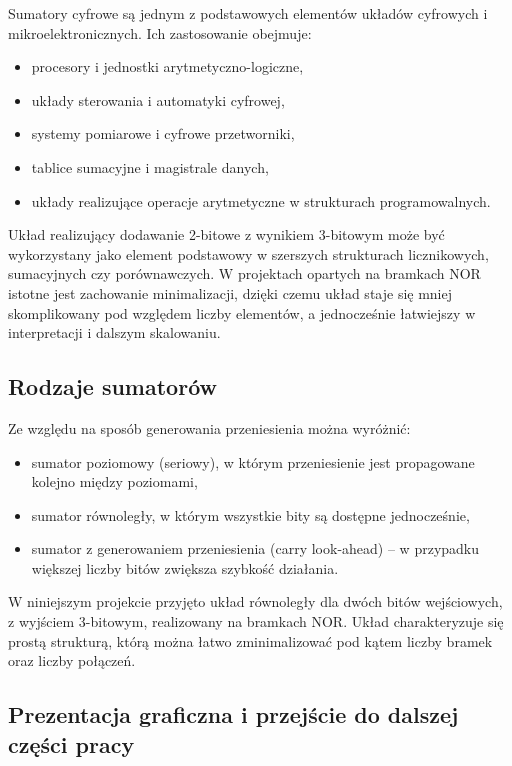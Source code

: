 \documentclass[11pt]{article}
\begin{document}
Sumatory cyfrowe są jednym z podstawowych elementów układów cyfrowych i mikroelektronicznych. Ich zastosowanie obejmuje:
\begin{itemize}
    \item procesory i jednostki arytmetyczno-logiczne,
    \item układy sterowania i automatyki cyfrowej,
    \item systemy pomiarowe i cyfrowe przetworniki,
    \item tablice sumacyjne i magistrale danych,
    \item układy realizujące operacje arytmetyczne w strukturach programowalnych.
\end{itemize}

Układ realizujący dodawanie 2-bitowe z wynikiem 3-bitowym może być wykorzystany jako element podstawowy w szerszych strukturach licznikowych, sumacyjnych czy porównawczych. W projektach opartych na bramkach NOR istotne jest zachowanie minimalizacji, dzięki czemu układ staje się mniej skomplikowany pod względem liczby elementów, a jednocześnie łatwiejszy w interpretacji i dalszym skalowaniu.

\subsection{Rodzaje sumatorów}

Ze względu na sposób generowania przeniesienia można wyróżnić:
\begin{itemize}
    \item sumator poziomowy (seriowy), w którym przeniesienie jest propagowane kolejno między poziomami,
    \item sumator równoległy, w którym wszystkie bity są dostępne jednocześnie,
    \item sumator z generowaniem przeniesienia (carry look-ahead) -- w przypadku większej liczby bitów zwiększa szybkość działania.
\end{itemize}

W niniejszym projekcie przyjęto układ równoległy dla dwóch bitów wejściowych, z wyjściem 3-bitowym, realizowany na bramkach NOR. Układ charakteryzuje się prostą strukturą, którą można łatwo zminimalizować pod kątem liczby bramek oraz liczby połączeń.

\subsection{Prezentacja graficzna i przejście do dalszej części pracy}
\end{document}
